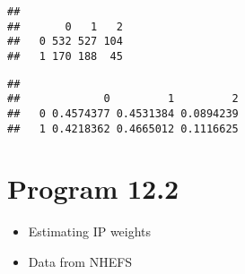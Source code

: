 \documentclass[10pt,]{book}
\newenvironment{Shaded}{\begin{snugshade}}{\end{snugshade}}
\newcommand{\DecValTok}[1]{\textcolor[rgb]{0.00,0.00,0.81}{#1}}
\newcommand{\KeywordTok}[1]{\textcolor[rgb]{0.13,0.29,0.53}{\textbf{#1}}}
\newcommand{\NormalTok}[1]{#1}
\newcommand{\OperatorTok}[1]{\textcolor[rgb]{0.81,0.36,0.00}{\textbf{#1}}}
\providecommand{\tightlist}{%
  \setlength{\itemsep}{0pt}\setlength{\parskip}{0pt}}
\begin{document}
\begin{Shaded}
\end{Shaded}

\begin{verbatim}
##    
##       0   1   2
##   0 532 527 104
##   1 170 188  45
\end{verbatim}

\begin{Shaded}
\end{Shaded}

\begin{verbatim}
##    
##             0         1         2
##   0 0.4574377 0.4531384 0.0894239
##   1 0.4218362 0.4665012 0.1116625
\end{verbatim}

\hypertarget{program-12.2}{%
\section{Program 12.2}\label{program-12.2}}

\begin{itemize}
\tightlist
\item
  Estimating IP weights
\item
  Data from NHEFS
\end{itemize}
\end{document}

